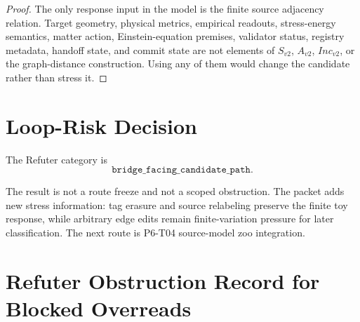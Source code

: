 \documentclass[11pt]{article}
\begin{document}
\begin{proof}
The only response input in the model is the finite source adjacency relation.
Target geometry, physical metrics, empirical readouts, stress-energy
semantics, matter action, Einstein-equation premises, validator status,
registry metadata, handoff state, and commit state are not elements of
\(S_{v2}\), \(A_{v2}\), \(Inc_{v2}\), or the graph-distance construction.
Using any of them would change the candidate rather than stress it.
\end{proof}

\section{Loop-Risk Decision}

The Refuter category is
\[
  \texttt{bridge\_facing\_candidate\_path}.
\]

The result is not a route freeze and not a scoped obstruction. The packet adds
new stress information: tag erasure and source relabeling preserve the finite
toy response, while arbitrary edge edits remain finite-variation pressure for
later classification. The next route is P6-T04 source-model zoo integration.

\section{Refuter Obstruction Record for Blocked Overreads}
\end{document}
